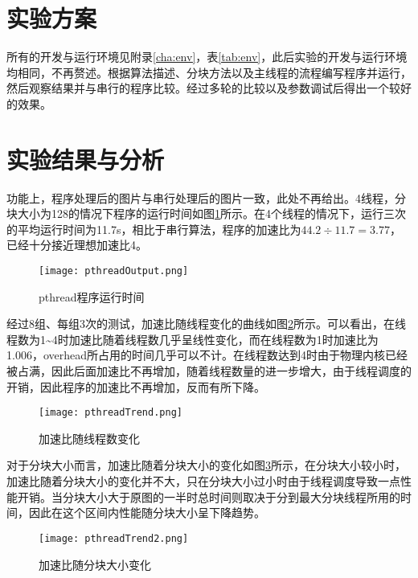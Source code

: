 \section{实验方案}
\par 所有的开发与运行环境见附录\ref{cha:env}，表\ref{tab:env}，此后实验的开发与运行环境均相同，不再赘述。根据算法描述、分块方法以及主线程的流程编写程序并运行，然后观察结果并与串行的程序比较。经过多轮的比较以及参数调试后得出一个较好的效果。

\section{实验结果与分析}
\par 功能上，程序处理后的图片与串行处理后的图片一致，此处不再给出。4线程，分块大小为128的情况下程序的运行时间如图\ref{fig:pthreadOutput}所示。在4个线程的情况下，运行三次的平均运行时间为11.7s，相比于串行算法，程序的加速比为\(44.2\div 11.7 = 3.77\)，已经十分接近理想加速比4。
\begin{figure}[htpb]
    \centering
    \texttt{[image: pthreadOutput.png]}
    \caption{pthread程序运行时间}
    \label{fig:pthreadOutput}
\end{figure}

\par 经过8组、每组3次的测试，加速比随线程变化的曲线如图\ref{fig:pthreadTrend}所示。可以看出，在线程数为1\textasciitilde 4时加速比随着线程数几乎呈线性变化，而在线程数为1时加速比为1.006，overhead所占用的时间几乎可以不计。在线程数达到4时由于物理内核已经被占满，因此后面加速比不再增加，随着线程数量的进一步增大，由于线程调度的开销，因此程序的加速比不再增加，反而有所下降。
\begin{figure}[htpb]
    \centering
    \texttt{[image: pthreadTrend.png]}
    \caption{加速比随线程数变化}
    \label{fig:pthreadTrend}
\end{figure}

\par 对于分块大小而言，加速比随着分块大小的变化如图\ref{fig:pthreadTrend2}所示，在分块大小较小时，加速比随着分块大小的变化并不大，只在分块大小过小时由于线程调度导致一点性能开销。当分块大小大于原图的一半时总时间则取决于分到最大分块线程所用的时间，因此在这个区间内性能随分块大小呈下降趋势。
\begin{figure}[htpb]
    \centering
    \texttt{[image: pthreadTrend2.png]}
    \caption{加速比随分块大小变化}
    \label{fig:pthreadTrend2}
\end{figure}


